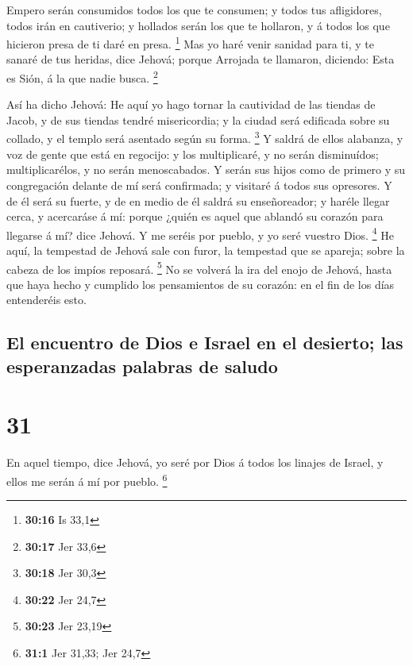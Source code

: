  Empero serán consumidos todos los que te consumen; y
todos tus afligidores, todos irán en cautiverio; y hollados serán los
que te hollaron, y á todos los que hicieron presa de ti daré en presa.
\footnote{\textbf{30:16} Is 33,1}  Mas yo haré venir
sanidad para ti, y te sanaré de tus heridas, dice Jehová; porque
Arrojada te llamaron, diciendo: Esta es Sión, á la que nadie busca.
\footnote{\textbf{30:17} Jer 33,6}

 Así ha dicho Jehová: He aquí yo hago tornar la
cautividad de las tiendas de Jacob, y de sus tiendas tendré
misericordia; y la ciudad será edificada sobre su collado, y el templo
será asentado según su forma. \footnote{\textbf{30:18} Jer 30,3}
 Y saldrá de ellos alabanza, y voz de gente que está en
regocijo: y los multiplicaré, y no serán disminuídos; multiplicarélos, y
no serán menoscabados.  Y serán sus hijos como de primero
y su congregación delante de mí será confirmada; y visitaré á todos sus
opresores.  Y de él será su fuerte, y de en medio de él
saldrá su enseñoreador; y haréle llegar cerca, y acercaráse á mí: porque
¿quién es aquel que ablandó su corazón para llegarse á mí? dice Jehová.
 Y me seréis por pueblo, y yo seré vuestro Dios.
\footnote{\textbf{30:22} Jer 24,7}  He aquí, la tempestad
de Jehová sale con furor, la tempestad que se apareja; sobre la cabeza
de los impíos reposará. \footnote{\textbf{30:23} Jer 23,19}
 No se volverá la ira del enojo de Jehová, hasta que haya
hecho y cumplido los pensamientos de su corazón: en el fin de los días
entenderéis esto.

\hypertarget{el-encuentro-de-dios-e-israel-en-el-desierto-las-esperanzadas-palabras-de-saludo}{%
\subsection{El encuentro de Dios e Israel en el desierto; las
esperanzadas palabras de
saludo}\label{el-encuentro-de-dios-e-israel-en-el-desierto-las-esperanzadas-palabras-de-saludo}}

\hypertarget{section-30}{%
\section{31}\label{section-30}}

 En aquel tiempo, dice Jehová, yo seré por Dios á todos
los linajes de Israel, y ellos me serán á mí por pueblo. \footnote{\textbf{31:1}
  Jer 31,33; Jer 24,7}

